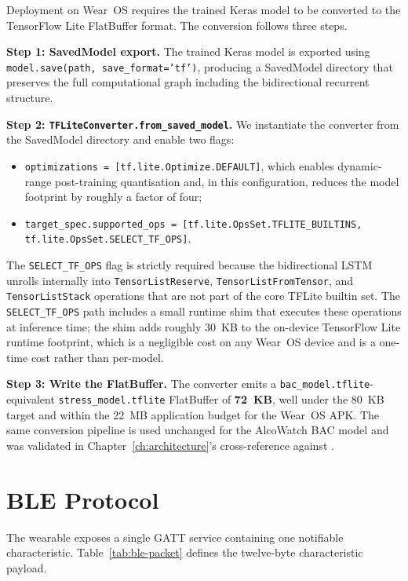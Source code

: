 Deployment on Wear~OS requires the trained Keras model to be
converted to the TensorFlow Lite \citep{tflite2023} FlatBuffer
format. The conversion follows three steps.

\textbf{Step 1: SavedModel export.} The trained Keras model is
exported using \texttt{model.save(path, save\_format='tf')},
producing a SavedModel directory that preserves the full computational
graph including the bidirectional recurrent structure.

\textbf{Step 2: \texttt{TFLiteConverter.from\_saved\_model}.} We
instantiate the converter from the SavedModel directory and enable
two flags:
\begin{itemize}
  \item \texttt{optimizations = [tf.lite.Optimize.DEFAULT]}, which
  enables dynamic-range post-training quantisation and, in this
  configuration, reduces the model footprint by roughly a factor
  of four;
  \item \texttt{target\_spec.supported\_ops =
  [tf.lite.OpsSet.TFLITE\_BUILTINS, tf.lite.OpsSet.SELECT\_TF\_OPS]}.
\end{itemize}

The \texttt{SELECT\_TF\_OPS} flag is strictly required because the
bidirectional LSTM unrolls internally into \texttt{TensorListReserve},
\texttt{TensorListFromTensor}, and \texttt{TensorListStack} operations
that are not part of the core TFLite builtin set. The
\texttt{SELECT\_TF\_OPS} path includes a small runtime shim that
executes these operations at inference time; the shim adds roughly
30~KB to the on-device TensorFlow Lite runtime footprint, which is
a negligible cost on any Wear~OS device and is a one-time cost rather
than per-model.

\textbf{Step 3: Write the FlatBuffer.} The converter emits a
\texttt{bac\_model.tflite}-equivalent \texttt{stress\_model.tflite}
FlatBuffer of \textbf{72~KB}, well under the 80~KB
target and within the 22~MB application budget for the Wear~OS APK.
The same conversion pipeline is used unchanged for the AlcoWatch
BAC model and was validated in Chapter~\ref{ch:architecture}'s
cross-reference against \citet{acn1408}.

\section{BLE Protocol}
\label{sec:m-ble}

The wearable exposes a single GATT service containing one notifiable
characteristic. Table~\ref{tab:ble-packet} defines the twelve-byte
characteristic payload.

